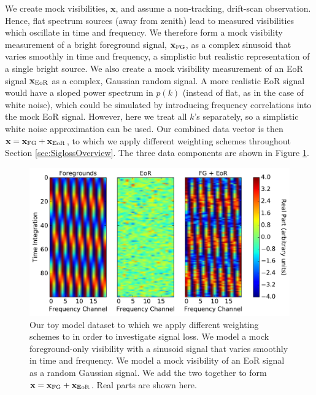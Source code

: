\documentclass[preprint2,numberedappendix,tighten]{aastex6}  %
\begin{document}
We create mock visibilities, $\textbf{x}$, and assume a non-tracking, drift-scan observation. Hence, flat spectrum sources (away from zenith) lead to measured visibilities which oscillate in time and frequency. We therefore form a mock visibility measurement of a bright foreground signal, $\textbf{x}_{\rm FG}$, as a complex sinusoid that varies smoothly in time and frequency, a simplistic but realistic representation of a single bright source. We also create a mock visibility measurement of an EoR signal $\textbf{x}_{\rm EoR}$ as a complex, Gaussian random signal. A more realistic EoR signal would have a sloped power spectrum in $p(k)$ (instead of flat, as in the case of white noise), which could be simulated by introducing frequency correlations into the mock EoR signal. However, here we treat all $k$'s separately, so a simplistic white noise approximation can be used. Our combined data vector is then $\textbf{x} = 
\textbf{x}_{\rm FG} + \textbf{x}_{\rm EoR}$, to which we apply different weighting schemes throughout Section \ref{sec:SiglossOverview}. The three data components are shown in Figure 
\ref{fig:toy_sigloss1}. 

\begin{figure}
	\centering
	\includegraphics[trim={0cm 0cm 0cm 0cm},clip,width=\columnwidth]{plots/toy_sigloss1.pdf}
	\caption{Our toy model dataset to which we apply different weighting schemes to in order to investigate signal loss. We model a mock foreground-only visibility with a sinusoid signal that varies smoothly in 
time and frequency. We model a mock visibility of an EoR signal as a random Gaussian signal. We add the two together to form $\textbf{x} = 
\textbf{x}_{\rm FG} + \textbf{x}_{\rm EoR}$. Real parts are shown here.}
	\label{fig:toy_sigloss1}
\end{figure}
\end{document}
